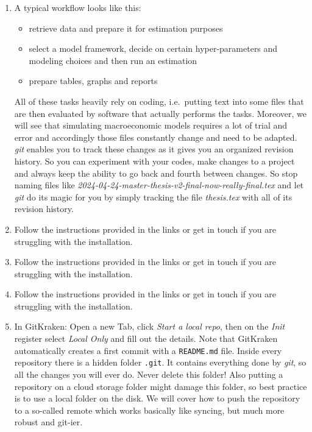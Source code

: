 \begin{enumerate}
\item
A typical workflow looks like this:
\begin{itemize}
\item retrieve data and prepare it for estimation purposes
\item select a model framework, decide on certain hyper-parameters and modeling choices and then run an estimation
\item prepare tables, graphs and reports
\end{itemize}
All of these tasks heavily rely on coding, i.e.\ putting text into some files that are then evaluated by software that actually performs the tasks.
Moreover, we will see that simulating macroeconomic models requires a lot of trial and error and accordingly those files constantly change and need to be adapted.
\emph{git} enables you to track these changes as it gives you an organized revision history.
So you can experiment with your codes, make changes to a project and always keep the ability to go back and fourth between changes.
So stop naming files like \emph{2024{-}04{-}24-master-thesis-v2-final-now-really-final.tex}
  and let \emph{git} do its magic for you by simply tracking the file \emph{thesis.tex} with all of its revision history.

\item
Follow the instructions provided in the links or get in touch if you are struggling with the installation.

\item
Follow the instructions provided in the links or get in touch if you are struggling with the installation.

\item
Follow the instructions provided in the links or get in touch if you are struggling with the installation.

\item
In GitKraken: Open a new Tab, click \emph{Start a local repo}, then on the \emph{Init} register select \emph{Local Only} and fill out the details.
Note that GitKraken automatically creates a first commit with a \texttt{README.md} file.
Inside every repository there is a hidden folder \texttt{.git}.
It contains everything done by \emph{git}, so all the changes you will ever do.
Never delete this folder!
Also putting a repository on a cloud storage folder might damage this folder,
  so best practice is to use a local folder on the disk.
We will cover how to push the repository to a so-called remote which works basically like syncing,
  but much more robust and git-ier.


\end{enumerate}
